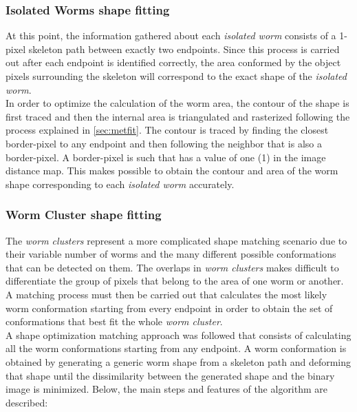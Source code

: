 \subsubsection{Isolated Worms shape fitting}
\label{sec:metiso}

At this point, the information gathered about each \emph{isolated worm} 
consists of a 1-pixel skeleton path between exactly two endpoints. 
Since this process is carried
out after each endpoint is identified correctly, the area conformed by the object pixels
surrounding the skeleton will correspond to the exact shape of the \emph{isolated worm}.\\

In order to optimize the calculation of the worm area, the contour of the shape is first
traced and then the internal area is triangulated and rasterized following the process
explained in \ref{sec:metfit}. The contour is traced by finding the closest border-pixel
to any endpoint and then following the neighbor that is also a border-pixel. A
border-pixel is such that has a value of one (1) in the image distance map.
This makes possible to obtain the contour and area of the worm shape corresponding to each 
\emph{isolated worm} accurately.


\subsubsection{Worm Cluster shape fitting}
\label{sec:clusterfit}

The \emph{worm clusters} represent a more complicated shape matching scenario due to their
variable number of worms and the many different possible conformations that can be detected
on them. 
The  overlaps in \emph{worm clusters} makes difficult to differentiate the group of pixels
that belong to the area of one worm or another. A matching process must then be 
carried out that calculates the most likely worm conformation starting from every
endpoint in order to obtain the set of conformations that best fit the whole 
\emph{worm cluster}.\\

A shape optimization matching approach was followed that consists of calculating all the 
worm conformations starting from any endpoint. A worm conformation is obtained by generating
a generic worm shape from a skeleton path and deforming that shape until the dissimilarity
between the generated shape and the binary image is minimized. Below, the main steps and 
features of the algorithm are described:


